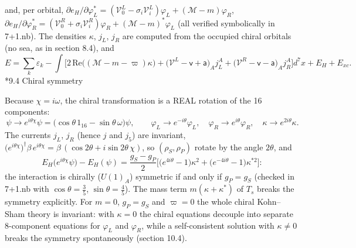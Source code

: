 \documentclass[10pt,a4paper]{article}
\makeatletter
\renewcommand\subsection{\@startsection{subsection}{2}{\z@}{-3.25ex\@plus -1ex \@minus -.2ex}{1.5ex \@plus .2ex}{\normalfont\large\bfseries\raggedright}}
\makeatother
\begin{document}
and, per orbital, $\partial e_H/\partial\varphi_L^*=(\mathcal V^L_0-\sigma_i\mathcal V^L_i)\varphi_L+(\mathcal M-m)\varphi_R$, $\partial e_H/\partial\varphi_R^*=(\mathcal V^R_0+\sigma_i\mathcal V^R_i)\varphi_R+(\mathcal M-m)^*\varphi_L$ (all verified symbolically in 7+1.nb). The densities $\kappa$, $j_L$, $j_R$ are computed from the occupied chiral orbitals (no sea, as in section 8.4), and
\begin{equation*}
E=\sum_k\varepsilon_k-\int\Big[2\,\mathrm{Re}\big((\mathcal M-m-\varpi)\kappa\big)+\big(\mathcal V^L-\mathsf v+\mathsf a\big)_Aj_L^A+\big(\mathcal V^R-\mathsf v-\mathsf a\big)_Aj_R^A\Big]d^7x+E_H+E_{xc}.
\end{equation*}
\subsection*{9.4 Chiral symmetry}
Because $\chi=i\omega$, the chiral transformation is a REAL rotation of the 16 components:
\begin{equation*}
\psi\to e^{i\theta\chi}\psi=\big(\cos\theta\,1_{16}-\sin\theta\,\omega\big)\psi,\qquad \varphi_L\to e^{-i\theta}\varphi_L,\quad \varphi_R\to e^{i\theta}\varphi_R,\quad \kappa\to e^{2i\theta}\kappa .
\end{equation*}
The currents $j_L$, $j_R$ (hence $j$ and $j_5$) are invariant, $\big(e^{i\theta\chi}\big)^\dagger\beta\,e^{i\theta\chi}=\beta\,(\cos2\theta+i\sin2\theta\,\chi)$, so $(\rho_S,\rho_P)$ rotate by the angle $2\theta$, and
\begin{equation*}
E_H\big(e^{i\theta\chi}\psi\big)-E_H(\psi)=\frac{g_S-g_P}{2}\Big[\big(e^{4i\theta}-1\big)\kappa^2+\big(e^{-4i\theta}-1\big)\kappa^{*2}\Big]:
\end{equation*}
the interaction is chirally ($U(1)_A$) symmetric if and only if $g_P=g_S$ (checked in 7+1.nb with $\cos\theta=\frac35$, $\sin\theta=\frac45$). The mass term $m(\kappa+\kappa^*)$ of $T_s$ breaks the symmetry explicitly. For $m=0$, $g_P=g_S$ and $\varpi=0$ the whole chiral Kohn–Sham theory is invariant: with $\kappa=0$ the chiral equations decouple into separate 8-component equations for $\varphi_L$ and $\varphi_R$, while a self-consistent solution with $\kappa\neq0$ breaks the symmetry spontaneously (section 10.4).
\end{document}
